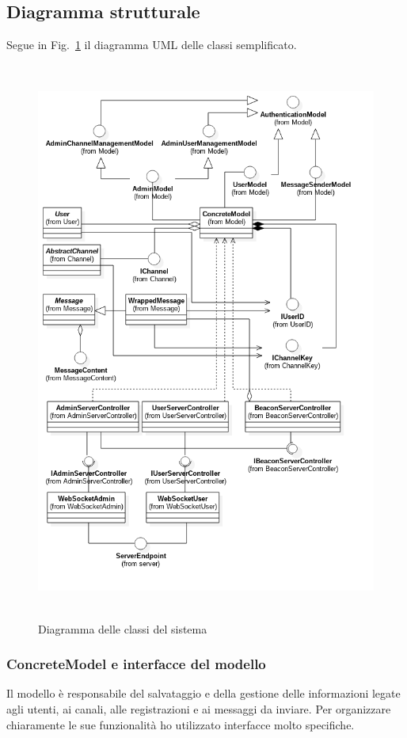 	\subsection{Diagramma strutturale}
	Segue in Fig.~\ref{diagrammaclassi} il diagramma UML delle classi semplificato.

	\begin{figure}[H]
		\begin{center}
			\includegraphics[height=18.5cm,keepaspectratio]{UML/png/Design Model__SimpleClasses_6}
			\caption{Diagramma delle classi del sistema}\label{diagrammaclassi}
		\end{center}
	\end{figure}

		\subsubsection{ConcreteModel e interfacce del modello}
	Il modello è responsabile del salvataggio e della gestione delle informazioni legate agli utenti, ai canali, alle registrazioni e ai messaggi da inviare. Per organizzare chiaramente le sue funzionalità ho utilizzato interfacce molto specifiche.

